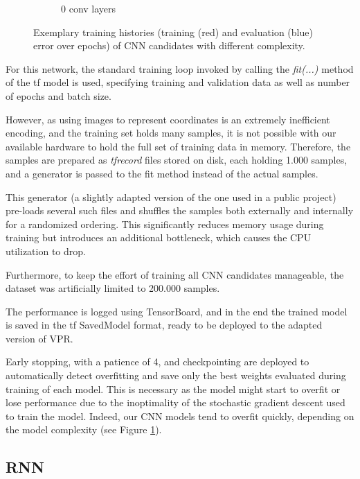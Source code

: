 \begin{figure}
\begin{subfigure}[b]{0.3\linewidth}
		\caption{0 conv layers}
	\end{subfigure}
	\caption{Exemplary training histories (training (red) and evaluation (blue) error over epochs) of \gls{CNN} candidates with different complexity.}
	\label{fig:cnn-train}
\end{figure}

For this network, the standard training loop invoked by calling the \textit{fit(...)} method of the \gls{tf} model is used, specifying training and validation data as well as number of epochs and batch size.

However, as using images to represent coordinates is an extremely inefficient encoding, and the training set holds many samples, it is not possible with our available hardware to hold the full set of training data in memory. Therefore, the samples are prepared as \textit{tfrecord} files stored on disk, each holding 1.000 samples, and a generator is passed to the fit method instead of the actual samples.

This generator (a slightly adapted version of the one used in a public project\cite{tfrecord-project-web}) pre-loads several such files and shuffles the samples both externally and internally for a randomized ordering. This significantly reduces memory usage during training but introduces an additional bottleneck, which causes the CPU utilization to drop.

Furthermore, to keep the effort of training all \gls{CNN} candidates manageable, the dataset was artificially limited to 200.000 samples.

The performance is logged using TensorBoard\cite{tensorboard-web}, and in the end the trained model is saved in the \gls{tf} SavedModel format\cite{savedmodel-web}, ready to be deployed to the adapted version of \gls{VPR}.

Early stopping, with a patience of 4, and checkpointing are deployed to automatically detect overfitting and save only the best weights evaluated during training of each model. This is necessary as the model might start to overfit or lose performance due to the inoptimality of the stochastic gradient descent used to train the model. Indeed, our \gls{CNN} models tend to overfit quickly, depending on the model complexity (see Figure \ref{fig:cnn-train}). 

\subsection{\gls{RNN}}

